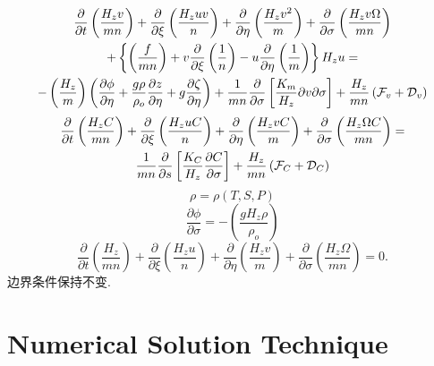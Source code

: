 \documentclass[a3paper,12pt]{article}
\begin{document}
    {\samepage
    \begin{multline}
    \frac{\partial}{\partial t} \left( \frac{H_z v}{mn} \right) + \frac
    {\partial}{\partial \xi} \left( \frac{H_z uv}{n} \right ) + \frac
    {\partial}{\partial \eta} \left( \frac{H_z v^2}{m} \right) + \frac
    {\partial}{\partial \sigma} \left( \frac{H_z v\Omega}{mn} \right)
    \\
    + \left\{\left(\frac{f}{mn} \right) + v \frac{\partial}{\partial \xi}
    \left( \frac{1}{n} \right) - u \frac{\partial}{\partial \eta} \left(
    \frac{1}{m} \right) \right\} H_z u =
    \\
    -\left( \frac{H_z }{m} \right )
    \left( \frac{\partial \phi}{\partial \eta} +
    \frac{g \rho}{\rho_o} \frac{\partial z}{\partial \eta} +
    g \frac{\partial \zeta}{\partial \eta} \right) +
    \frac{ 1}{mn} \frac{\partial}{\partial \sigma}
    \left[ \frac{K_m}{H_z} {\partial v}{\partial \sigma} \right] +
    \frac{ H_z}{mn}
    \left( {\cal F}_v + {\cal D}_v \right)
    \label{st14}
    \end{multline}
    }
    \begin{multline}
    \frac{\partial}{\partial t} \left( \frac{H_z C}{mn} \right) +
    \frac {\partial}{\partial \xi} \left( \frac{H_z uC}{n} \right ) +
    \frac {\partial}{\partial \eta} \left( \frac{H_z vC}{m} \right) +
    \frac {\partial}{\partial \sigma}
    \left( \frac{H_z \Omega C}{mn} \right) =
    \\
    \frac{ 1}{mn} \frac{\partial}{\partial s}
    \left[ \frac{K_C}{H_z} \frac{\partial C}{\partial \sigma} \right] +
    \frac{ H_z}{mn}
    \left( {\cal F}_{C} + {\cal D}_{C} \right)
    \label{st15}
    \end{multline}
    \begin{equation}
    \rho = \rho(T,S,P)
    \end{equation}
    \begin{equation}
    \frac{\partial \phi}{\partial \sigma} = -\left( \frac{gH_z \rho}
    {\rho_o} \right)
    \label{st16}
    \end{equation}
    \begin{equation}
    \frac{\partial}{\partial t} \left( \frac{H_z}{mn} \right) +
    \frac{\partial}{\partial \xi} \left( \frac{H_z u}{n} \right) +
    \frac{\partial}{\partial \eta} \left( \frac{H_z v}{m} \right) +
    \frac{\partial}{\partial \sigma}\left( \frac{H_z \Omega}{mn} \right)
    = 0.
    \label{st17}
    \end{equation}
    边界条件保持不变.
    \section{Numerical Solution Technique}
\end{document}
